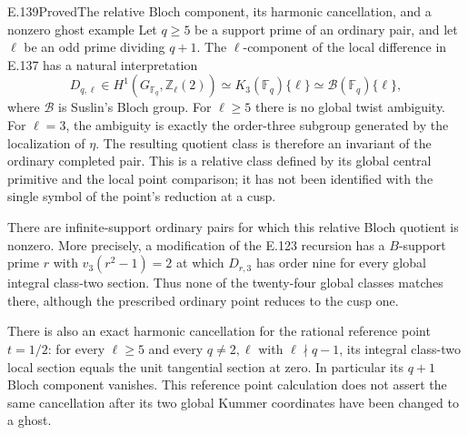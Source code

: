\begin{result}{E.139}{Proved}{The relative Bloch component, its harmonic cancellation, and a nonzero ghost example}
Let $q\ge5$ be a support prime of an ordinary pair, and let
$\ell$ be an odd prime dividing $q+1$. The $\ell$-component
of the local difference in E.137 has a natural interpretation
\[
 D_{q,\ell}\in H^1(G_{\mathbb F_q},\mathbb Z_\ell(2))
       \simeq K_3(\mathbb F_q)\{\ell\}
       \simeq \mathcal B(\mathbb F_q)\{\ell\},
 \tag{E.139.1}
\]
where $\mathcal B$ is Suslin's Bloch group. For $\ell\ge5$
there is no global twist ambiguity. For $\ell=3$, the ambiguity
is exactly the order-three subgroup generated by the localization
of $\eta$. The resulting quotient class is therefore an invariant
of the ordinary completed pair. This is a relative class defined
by its global central primitive and the local point comparison;
it has not been identified with the single symbol of the point's
reduction at a cusp.

There are infinite-support ordinary pairs for which this relative
Bloch quotient is nonzero. More precisely, a modification of the
E.123 recursion has a $B$-support prime $r$ with
$v_3(r^2-1)=2$ at which $D_{r,3}$ has order nine for every
global integral class-two section. Thus none of the twenty-four
global classes matches there, although the prescribed ordinary
point reduces to the cusp one.

There is also an exact harmonic cancellation for the rational
reference point $t=1/2$: for every $\ell\ge5$ and every
$q\ne2,\ell$ with $\ell\nmid q-1$, its integral class-two
local section equals the unit tangential section at zero.
In particular its $q+1$ Bloch component vanishes. This reference
point calculation does not assert the same cancellation after
its two global Kummer coordinates have been changed to a ghost.
\end{result}
